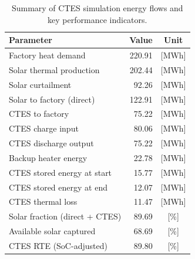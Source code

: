 \renewcommand{\arraystretch}{1.2}
\begin{table}[h]
\centering
\begin{tabular}{l|r c}
\hline
Parameter & Value & Unit \\
\hline
Factory heat demand & 220.91 & [MWh] \\
Solar thermal production & 202.44 & [MWh] \\
Solar curtailment & 92.26 & [MWh] \\
Solar to factory (direct) & 122.91 & [MWh] \\
CTES to factory & 75.22 & [MWh] \\
CTES charge input & 80.06 & [MWh] \\
CTES discharge output & 75.22 & [MWh] \\
Backup heater energy & 22.78 & [MWh] \\
CTES stored energy at start & 15.77 & [MWh] \\
CTES stored energy at end & 12.07 & [MWh] \\
CTES thermal loss & 11.47 & [MWh] \\
\hline
Solar fraction (direct + CTES) & 89.69 & [\%] \\
Available solar captured & 68.69 & [\%] \\
CTES RTE (SoC-adjusted) & 89.80 & [\%] \\
\hline
\end{tabular}
\caption{Summary of CTES simulation energy flows and key performance indicators.}
\label{tab:ctes-simulation-summary}
\end{table}
